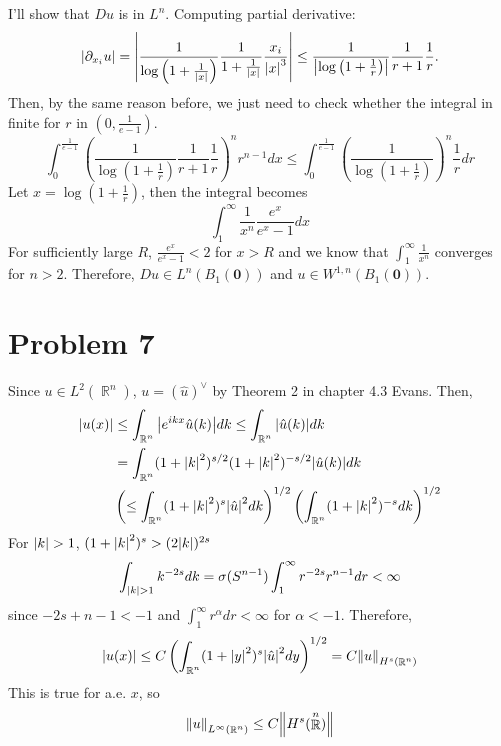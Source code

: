 \documentclass{article}
\DeclareMathOperator{\rr}{\mathbb{R}}
\begin{document}
I'll show that $Du$ is in $L^n$. Computing partial derivative:
\begin{equation*}
\abs{\partial_{x_i} u}=\abs{\frac{1}{\log\left(1+\frac{1}{\abs{x}}\right)}\frac{1}{1+\frac{1}{\abs{x}}}\frac{x_i}{\abs{x}^3}}\leq  \frac{1}{\abs{\log\left(1+\frac{1}{r}\right)}}\frac{1}{r+1}\frac{1}{r}.
\end{equation*}
Then, by the same reason before, we just need to check whether the integral in finite for $r$ in $\left(0, \frac{1}{e-1}\right)$.
\begin{equation*}
\int_0^{\frac{1}{e-1}} \left(\frac{1}{\log\left(1+\frac{1}{r}\right)}\frac{1}{r+1}\frac{1}{r}\right)^n r^{n-1}dx \leq \int_0^{\frac{1}{e-1}} \left(\frac{1}{\log\left(1+\frac{1}{r}\right)}\right)^n \frac{1}{r}dr
\end{equation*}
Let $x=\log\left(1+\frac{1}{r}\right)$, then the integral becomes
\begin{equation*}
\int_1^\infty \frac{1}{x^n}\frac{e^x}{e^x-1}dx
\end{equation*}
For sufficiently large $R$, $\frac{e^x}{e^x-1}<2$ for $x>R$ and we know that $\int_1^\infty \frac{1}{x^n}$ converges for $n>2$. Therefore, $Du\in L^n(B_1(\bm{0}))$ and $u\in W^{1,n}(B_1(\bm{0}))$.
\section*{Problem 7}
Since $u\in L^2(\rr^n)$, $u=(\hat{u})^\vee$ by Theorem 2 in chapter 4.3 Evans. Then,
\begin{equation*}
\begin{split}
\abs{u(x)}&\leq \int_{\rr^n}\abs{e^{ikx}\hat{u}(k)}dk\leq \int_{\rr^n}\abs{\hat{u}(k)}dk \\
&=\int_{\rr^n}(1+\abs{k}^2)^{s/2}(1+\abs{k}^2)^{-s/2}\abs{\hat{u}(k)}dk \\
&\left(\leq \int_{\rr^n}(1+\abs{k}^2)^{s}\abs{\hat{u}}^2dk\right)^{1/2}\left(\int_{\rr^n}(1+\abs{k}^2)^{-s}dk\right)^{1/2}
\end{split}
\end{equation*}
For $\abs{k}>1$, $(1+\abs{k}^2)^s> (2\abs{k})^{2s}$
\begin{equation*}
\int_{\abs{k}>1} k^{-2s}dk=\sigma(S^{n-1})\int_1^\infty r^{-2s}r^{n-1}dr<\infty
\end{equation*}
since $-2s+n-1<-1$ and $\int_1^\infty r^\alpha dr<\infty$ for $\alpha<-1$. Therefore,
\begin{equation*}
\abs{u(x)}\leq C\left(\int_{\rr^n}(1+\abs{y}^2)^s \abs{\hat{u}}^2 dy\right)^{1/2}=C\norm{u}_{H^s(\rr^n)}
\end{equation*}
This is true for a.e. $x$, so
\begin{equation*}
\norm{u}_{L^\infty(\rr^n)}\leq C\norm{H^s(\rr^n)}
\end{equation*}
\end{document}
